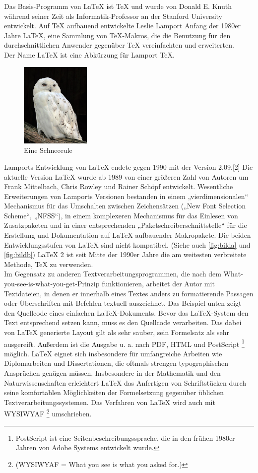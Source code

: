 \documentclass{scrreprt}
\begin{document}
	Das Basis-Programm von LaTeX ist TeX und wurde von Donald E. Knuth während seiner Zeit als Informatik-Professor an der Stanford University entwickelt. Auf TeX aufbauend entwickelte Leslie Lamport Anfang der 1980er Jahre LaTeX, eine Sammlung von TeX-Makros, die die Benutzung für den durchschnittlichen Anwender gegenüber TeX vereinfachten und erweiterten. 
	\\ Der Name LaTeX ist eine Abkürzung für Lamport TeX.
	\begin{figure}
	\includegraphics[width=0.3\textwidth]{images/396px-Bubo_scandiacus_(Linnaeus,_1758)_Male.jpg}
	\caption{Eine Schneeeule \cite{ref3}}
	\label{fig:schneeeule}
	\end{figure}{} 
	Lamports Entwicklung von LaTeX endete gegen 1990 mit der Version 2.09.[2] Die aktuelle Version LaTeX wurde ab 1989 von einer größeren Zahl von Autoren um Frank Mittelbach, Chris Rowley und Rainer Schöpf entwickelt. Wesentliche Erweiterungen von Lamports Versionen bestanden in einem „vierdimensionalen“ Mechanismus für das Umschalten zwischen Zeichensätzen („New Font Selection Scheme“, „NFSS“), in einem komplexeren Mechanismus für das Einlesen von Zusatzpaketen und in einer entsprechenden „Paketschreiberschnittstelle“ für die Erstellung und Dokumentation auf LaTeX aufbauender Makropakete. Die beiden Entwicklungsstufen von LaTeX sind nicht kompatibel. (Siehe auch \ref{fig:bilda} und \ref{fig:bildb})
	LaTeX 2 ist seit Mitte der 1990er Jahre die am weitesten verbreitete Methode, TeX zu verwenden.\\
	Im Gegensatz zu anderen Textverarbeitungsprogrammen, die nach dem What-you-see-is-what-you-get-Prinzip funktionieren, arbeitet der Autor mit Textdateien, in denen er innerhalb eines Textes anders zu formatierende Passagen oder Überschriften mit Befehlen textuell auszeichnet. Das Beispiel unten zeigt den Quellcode eines einfachen LaTeX-Dokuments. Bevor das LaTeX-System den Text entsprechend setzen kann, muss es den Quellcode verarbeiten. Das dabei von LaTeX generierte Layout gilt als sehr sauber, sein Formelsatz als sehr ausgereift. Außerdem ist die Ausgabe u. a. nach PDF, HTML und PostScript \footnote{PostScript ist eine Seitenbeschreibungssprache, die in den frühen 1980er Jahren von Adobe Systems entwickelt wurde.} möglich. LaTeX eignet sich insbesondere für umfangreiche Arbeiten wie Diplomarbeiten und Dissertationen, die oftmals strengen typographischen Ansprüchen genügen müssen. Insbesondere in der Mathematik und den Naturwissenschaften erleichtert LaTeX das Anfertigen von Schriftstücken durch seine komfortablen Möglichkeiten der Formelsetzung gegenüber üblichen Textverarbeitungssystemen. Das Verfahren von LaTeX wird auch mit WYSIWYAF \footnote{(WYSIWYAF = What you see is what you asked for.)}  umschrieben. 
	
\end{document}
